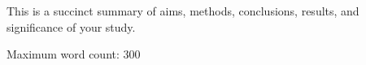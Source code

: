 \cleardoublepage %

This is a succinct summary of aims, methods, conclusions, results, and significance of your study. 

Maximum word count: 300

